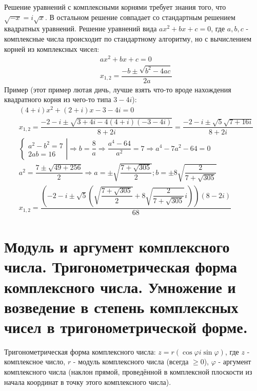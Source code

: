 \documentclass[12pt]{article}
\begin{document}
\begin{sloppypar}
    Решение уравнений с комплексными корнями требует знания того, что $\sqrt{-x} = i\sqrt{x}$. В остальном решение совпадает со стандартным решением квадратных уравнений. Решение уравнений вида $ax^2 + bx + c = 0$, где $a, b, c$ - комплексные числа происходит по стандартному алгоритму, но с вычислением корней из комплексных чисел:
    \begin{align*}
         & ax^2 + bx + c = 0                             \\
         & x_{1,2} = \dfrac{-b \pm \sqrt{b^2 - 4ac}}{2a}
    \end{align*}
    Пример (этот пример лютая дичь, лучше взять что-то вроде нахождения квадратного корня из чего-то типа $3 - 4i$):
    \begin{align*}
         & (4 + i)x^2 + (2 + i)x - 3 - 4i = 0                                                                                                    \\
         & x_{1,2} = \dfrac{-2 - i \pm \sqrt{3 + 4i - 4(4 + i)(-3 - 4i)}}{8 + 2i} = \dfrac{-2 - i \pm \sqrt{5}\sqrt{7 + 16i}}{8 + 2i}            \\
         & \left.\begin{cases}
                     a^2 - b^2 = 7 \\
                     2ab = 16
                 \end{cases}\right|
        \Rightarrow b = \dfrac{8}{a} \Rightarrow \dfrac{a^4 - 64}{a^2} = 7 \Rightarrow a^4 - 7a^2 - 64 = 0                                       \\
         & a^2 = \dfrac{7 \pm \sqrt{49 + 256}}{2} \Rightarrow a = \pm\sqrt{\dfrac{7 + \sqrt{305}}{2}}; b = \pm 8\sqrt{\dfrac{2}{7 + \sqrt{305}}} \\
         & x_{1,2} = \dfrac{(-2 - i \pm \sqrt{5}\left(\sqrt{\dfrac{7 + \sqrt{305}}{2}} + 8\sqrt{\dfrac{2}{7 + \sqrt{305}}}i\right))(8 - 2i)}{68}
    \end{align*}

    \section{Модуль и аргумент комплексного числа. Тригонометрическая форма комплексного числа. Умножение и возведение в степень комплексных чисел в тригонометрической форме.}
    Тригонометрическая форма комплексного числа: $z = r(\cos \varphi i\sin \varphi)$, где $z$ - комплексное число, $r$ - модуль комплексного числа (всегда $\ge 0$), $\varphi$ - аргумент комплексного числа (наклон прямой, проведённой в комплексной плоскости из начала координат в точку этого комплексного числа).


\end{sloppypar}
\end{document}
